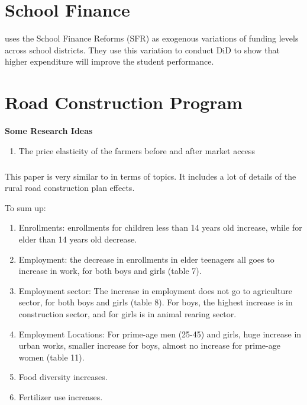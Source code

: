 
\chapter{School Finance} %
\label{cha:school_finance}

\textcite{JacksonJohnsonPersico2016} uses the School Finance Reforms (SFR) as exogenous variations of funding levels across school districts.
They use this variation to conduct DiD to show that higher expenditure will improve the student performance.


\chapter{Road Construction Program}


\noindent
\textbf{Some Research Ideas}

\begin{enumerate}
    \item The price elasticity of the farmers before and after market access
\end{enumerate}


\paragraph{\citet{Aggarwal2018}}

This paper is very similar to \citet{AdukiaAsherNovosad2019,AsherNovosad2019,Shamdasani2019} in terms of topics.
It includes a lot of details of the rural road construction plan effects.

To sum up:
\begin{enumerate}[nosep]
    \item Enrollments: enrollments for children less than 14 years old increase, while for elder than 14 years old decrease.
    \item Employment: the decrease in enrollments in elder teenagers all goes to increase in work, for both boys and girls (table 7).
    \item Employment sector: The increase in employment does not go to agriculture sector, for both boys and girls (table 8). For boys, the highest increase is in construction sector, and for girls is in animal rearing sector.
    \item Employment Locations: For prime-age men (25-45) and girls, huge increase in urban works, smaller increase for boys, almost no increase for prime-age women (table 11).
    \item Food diversity increases.
    \item Fertilizer use increases.
\end{enumerate}




